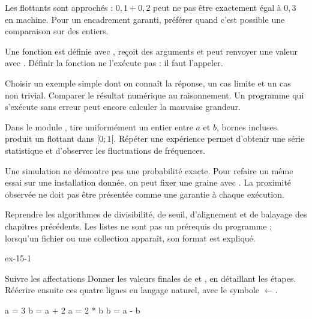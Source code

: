 \begin{attention}Les flottants sont approchés : $0{,}1+0{,}2$ peut ne pas être exactement égal à $0{,}3$ en machine. Pour un encadrement garanti, préférer quand c’est possible une comparaison sur des entiers.\end{attention}
\clearpage
{}
\begin{definition}Une fonction est définie avec , reçoit des arguments et peut renvoyer une valeur avec . Définir la fonction ne l’exécute pas : il faut l’appeler.\end{definition}
\begin{savoirfaire}
Choisir un exemple simple dont on connaît la réponse, un cas limite et un cas non trivial. Comparer le résultat numérique au raisonnement. Un programme qui s’exécute sans erreur peut encore calculer la mauvaise grandeur.
\end{savoirfaire}
\begin{propriete}Dans le module ,  tire uniformément un entier entre $a$ et $b$, bornes incluses.  produit un flottant dans $[0;1[$. Répéter une expérience permet d’obtenir une série statistique et d’observer les fluctuations de fréquences.\end{propriete}
\begin{attention}Une simulation ne démontre pas une probabilité exacte. Pour refaire un même essai sur une installation donnée, on peut fixer une graine avec . La proximité observée ne doit pas être présentée comme une garantie à chaque exécution.\end{attention}
Reprendre les algorithmes de divisibilité, de seuil, d’alignement et de balayage des chapitres précédents. Les listes ne sont pas un prérequis du programme ; lorsqu’un fichier ou une collection apparaît, son format est expliqué.
\clearpage{}
\begin{blocLivre}{ex-15-1}
\begin{exercice}[1]{Suivre les affectations}
Donner les valeurs finales de  et , en détaillant les étapes. Réécrire ensuite ces quatre lignes en langage naturel, avec le symbole $\leftarrow$.
\begin{python}
a = 3
b = a + 2
a = 2 * b
b = a - b
\end{python}
\end{exercice}
\end{blocLivre}
